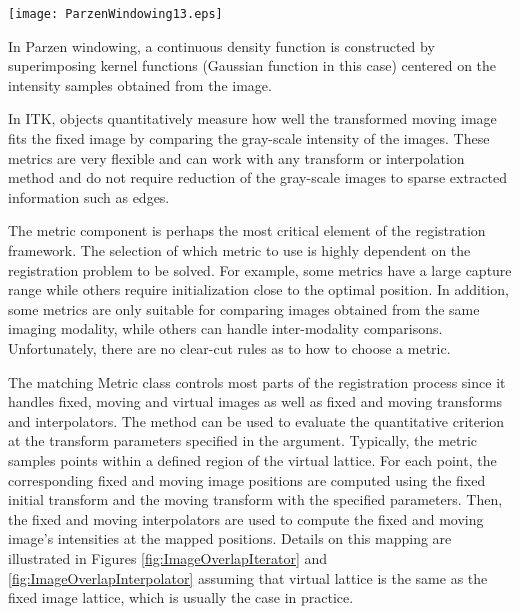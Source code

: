 %
%
%
%


\begin{floatingfigure}[rlp]{0.5\textwidth}
 \centering
 \texttt{[image: ParzenWindowing13.eps]}
 \caption[Parzen Windowing in Mutual Information]{
In Parzen windowing, a continuous density function is constructed by
superimposing kernel functions (Gaussian function in this case) centered on the
intensity samples obtained from the image.\label{fig:ParzenWindowing}}
\end{floatingfigure}

In ITK,  objects quantitatively measure how well
the transformed moving image fits the fixed image by comparing the gray-scale
intensity of the images. These metrics are very flexible and can work with any
transform or interpolation method and do not require reduction of the
gray-scale images to sparse extracted information such as edges.

The metric component is perhaps the most critical element of the registration
framework. The selection of which metric to use is highly dependent on the
registration problem to be solved. For example, some metrics have a large
capture range while others require initialization close to the optimal
position.  In addition, some metrics are only suitable for comparing images
obtained from the same imaging modality, while others can handle
inter-modality comparisons.
Unfortunately, there are no clear-cut rules as to how to choose a metric.


The matching Metric class controls most parts of the registration process
since it handles fixed, moving and virtual images as well as fixed and moving
transforms and interpolators.  The method  can be used to
evaluate the quantitative criterion at the transform parameters specified in
the argument.  Typically, the metric samples points within a defined region
of the virtual lattice.  For each point, the corresponding fixed and moving
image positions are computed using the fixed initial transform and the moving
transform with the specified parameters. Then, the fixed and moving interpolators
are used to compute the fixed and moving image's intensities at the mapped
positions. Details on this mapping are illustrated in Figures
\ref{fig:ImageOverlapIterator} and \ref{fig:ImageOverlapInterpolator} assuming
that virtual lattice is the same as the fixed image lattice, which is usually the
case in practice.

